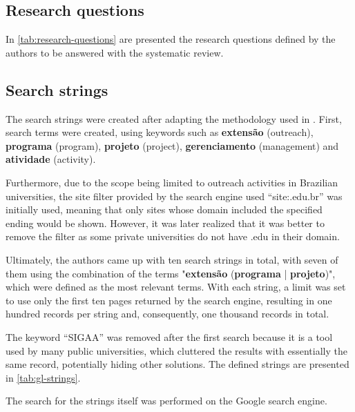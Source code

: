 

\subsection{Research questions}\label{sec:gl-planning-rq}

In \autoref{tab:research-questions} are presented the research questions defined by the authors to be answered with the systematic review.



\subsection{Search strings}\label{sec:gl-planning-strings}

The search strings were created after adapting the methodology used in \cite{godin2015applying}. First, search terms were created, using keywords such as \textbf{extensão} (outreach), \textbf{programa} (program), \textbf{projeto} (project), \textbf{gerenciamento} (management) and \textbf{atividade} (activity).

Furthermore, due to the scope being limited to outreach activities in Brazilian universities, the site filter provided by the search engine used ``site:.edu.br'' was initially used, meaning that only sites whose domain included the specified ending would be shown. However, it was later realized that it was better to remove the filter as some private universities do not have .edu in their domain.

Ultimately, the authors came up with ten search strings in total, with seven of them using the combination of the terms "\textbf{extensão} (\textbf{programa} | \textbf{projeto})", which were defined as the most relevant terms. With each string, a limit was set to use only the first ten pages returned by the search engine, resulting in one hundred records per string and, consequently, one thousand records in total.

The keyword ``\acs{SIGAA}'' was removed after the first search because it is a tool used by many public universities, which cluttered the results with essentially the same record, potentially hiding other solutions. The defined strings are presented in \autoref{tab:gl-strings}.



The search for the strings itself was performed on the Google search engine.

